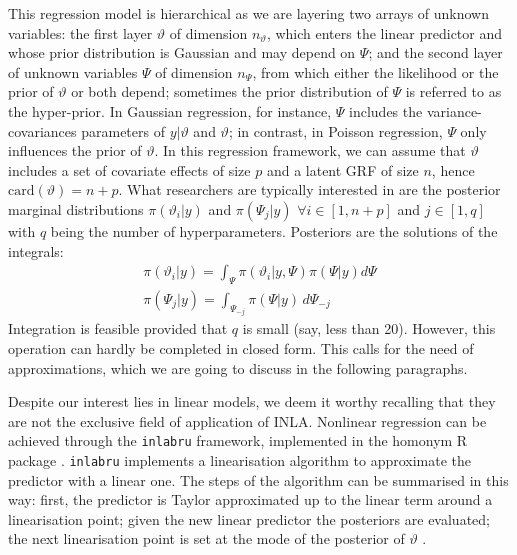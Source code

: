 \documentclass[openany, 11pt, oneside]{book}
\begin{document}
This regression model is hierarchical as we are layering two arrays of unknown variables: the first layer $\vartheta$ of dimension $n_\vartheta$, which enters the linear predictor and whose prior distribution is Gaussian and may depend on $\Psi$; and the second layer of unknown variables $\Psi$  of dimension $n_\Psi$, from which either the likelihood or the prior of $\vartheta$ or both depend; sometimes the prior distribution of $\Psi$ is referred to as the hyper-prior. In Gaussian regression, for instance, $\Psi$ includes the variance-covariances parameters of $y\vert \vartheta$ and $\vartheta$; in contrast, in Poisson regression, $\Psi$ only influences the prior of $\vartheta$. In this regression framework, we can assume that $\vartheta$ includes a set of covariate effects of size $p$ and a latent GRF of size $n$, hence $\mathrm{card}(\vartheta) = n+p$.
What researchers are typically interested in are the posterior marginal distributions $\pi(\vartheta_i \vert y)$ and $\pi(\Psi_j \vert y)$  $\forall i \in [1, n+p]$ and $j \in [1, q]$ with $q$ being the number of hyperparameters. Posteriors are the solutions of the integrals:
%
 \begin{equation}
 \label{eq:marginals}
 \begin{aligned}
 \pi(\vartheta_i \vert y) = \int_{\Psi} \pi(\vartheta_i \vert y, \Psi) \pi(\Psi \vert y) d \Psi\\
 \pi(\Psi_j\vert y) = \int_{\Psi_{-j}} \pi(\Psi \vert y) \, d\Psi_{-j}
 \end{aligned}
 \end{equation}
%
Integration is feasible provided that $q$ is small (say, less than 20). However, this operation can hardly be completed in closed form. This calls for the need of approximations, which we are going to discuss in the following paragraphs.

Despite our interest lies in linear models, we deem it worthy recalling that they are not the exclusive field of application of INLA. Nonlinear regression can be achieved through the \texttt{inlabru} framework, implemented in the homonym R package \parencite{inlabru2019}. \texttt{inlabru} implements a linearisation algorithm to approximate the predictor with a linear one. The steps of the algorithm can be summarised in this way: first, the predictor is Taylor approximated up to the linear term around a linearisation point; given the new linear predictor the posteriors are evaluated; the next linearisation point is set at the mode of the posterior of $\vartheta$ \parencite{inlabru2024}.
\end{document}
